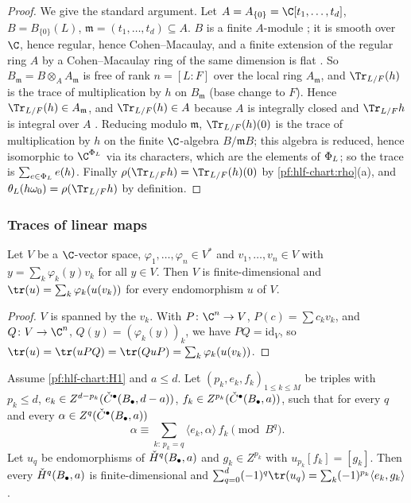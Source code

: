 \begin{proof}
We give the standard argument. Let $A=A_{\{0\}}=\C[t_1,\dots,t_d]$, $B=B_{\{0\}}(L)$, $\mathfrak m=(t_1,\dots,t_d)\subseteq A$. $B$ is a finite
$A$-module \cite[Cor.~13.13]{Eisenbud1995}; it is smooth over $\C$, hence regular, hence Cohen--Macaulay, and a finite extension of the regular
ring $A$ by a Cohen--Macaulay ring of the same dimension is flat \cite[Thm.~23.1]{Matsumura1989}. So $B_\mathfrak m=B\otimes_AA_\mathfrak m$ is free of
rank $n=[L:F]$ over the local ring $A_\mathfrak m$, and $\Tr_{L/F}(h)$ is the trace of multiplication by $h$ on $B_\mathfrak m$ (base change to $F$).
Hence $\Tr_{L/F}(h)\in A_\mathfrak m$, and $\Tr_{L/F}(h)\in A$ because $A$ is integrally closed and $\Tr_{L/F}h$ is integral over $A$
\cite[Prop.~5.15]{AtiyahMacdonald1969}. Reducing modulo $\mathfrak m$, $\Tr_{L/F}(h)(0)$ is the trace of multiplication by $h$ on the finite
$\C$-algebra $B/\mathfrak mB$; this algebra is reduced, hence isomorphic to $\C^{\hlfcfib_L}$ via its characters, which are the elements of
$\Phi_L$; so the trace is $\sum_{e\in\Phi_L}e(h)$. Finally $\rho(\Tr_{L/F}h)=\Tr_{L/F}(h)(0)$ by \cref{pf:hlf-chart:rho}(a), and
$\theta_L(h\omega_0)=\rho(\Tr_{L/F}h)$ by definition.
\end{proof}

\subsubsection*{Traces of linear maps}

\begin{lemma}\label{pf:hlf-chart:trlin}
Let $V$ be a $\C$-vector space, $\varphi_1,\dots,\varphi_n\in V^*$ and $v_1,\dots,v_n\in V$ with $y=\sum_k\varphi_k(y)v_k$ for all $y\in V$.
Then $V$ is finite-dimensional and $\tr(u)=\sum_k\varphi_k(u(v_k))$ for every endomorphism $u$ of $V$.
\end{lemma}

\begin{proof}
$V$ is spanned by the $v_k$. With $P\colon\C^n\to V$, $P(c)=\sum c_kv_k$, and $Q\colon V\to\C^n$, $Q(y)=(\varphi_k(y))_k$, we have $PQ=\mathrm{id}_V$,
so $\tr(u)=\tr(uPQ)=\tr(QuP)=\sum_k\varphi_k(u(v_k))$.
\end{proof}

\begin{lemma}\label{pf:hlf-chart:alttrace}
Assume \ref{pf:hlf-chart:H1} and $a\le d$. Let $(p_k,e_k,f_k)_{1\le k\le M}$ be triples with $p_k\le d$,
$e_k\in Z^{d-p_k}(\check{C}^\bullet(B_\bullet,d-a))$, $f_k\in Z^{p_k}(\check{C}^\bullet(B_\bullet,a))$, such that for every $q$ and every
$\alpha\in Z^q(\check{C}^\bullet(B_\bullet,a))$
\begin{equation}\label{eq:pf:hlf-chart:dualdec}
  \alpha\equiv\sum_{k:\,p_k=q}\langle e_k,\alpha\rangle\,f_k\pmod{B^q}.
\end{equation}
Let $u_q$ be endomorphisms of $\check{H}^q(B_\bullet,a)$ and $g_k\in Z^{p_k}$ with $u_{p_k}[f_k]=[g_k]$. Then every $\check{H}^q(B_\bullet,a)$ is
finite-dimensional and $\sum_{q=0}^d(-1)^q\tr(u_q)=\sum_k(-1)^{p_k}\langle e_k,g_k\rangle$.
\end{lemma}

